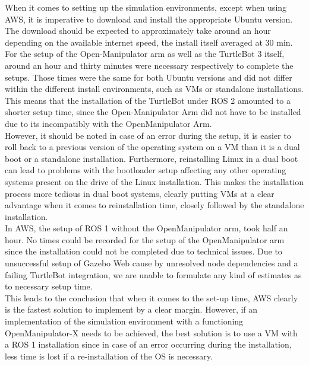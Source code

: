 \documentclass[plainarticle,zihtitle,english,final,hyperref,utf8]{zihpub}
\begin{document}
When it comes to setting up the simulation environments, except when using AWS, it is imperative to download and install the appropriate Ubuntu version. The download should be expected to approximately take around an hour depending on the available internet speed, the install itself averaged at 30 min. 
For the setup of the Open-Manipulator arm as well as the TurtleBot 3 itself, around an hour and thirty minutes were necessary respectively to complete the setups. Those times were the same for both Ubuntu versions and did not differ within the different install environments, such as VMs or standalone installations. This means that the installation of the TurtleBot under ROS 2 amounted to a shorter setup time, since the Open-Manipulator Arm did not have to be installed due to its incompatibly with the OpenManipulator Arm. \\
\newline
However, it should be noted in case of an error during the setup, it is easier to roll back to a previous version of the operating system on a VM than it is a dual boot or a standalone installation. Furthermore, reinstalling Linux in a dual boot can lead to problems with the bootloader setup affecting any other operating systems present on the drive of the Linux installation. This makes the installation process more tedious in dual boot systems, clearly putting VMs at a clear advantage when it comes to reinstallation time, closely followed by the standalone installation. \\
\newline
In AWS, the setup of ROS 1 without the OpenManipulator arm, took half an hour. No times could be recorded for the setup of the OpenManipulator arm since the installation could not be completed due to technical issues. 
Due to unsuccessful setup of Gazebo Web cause by unresolved node dependencies and a failing TurtleBot integration, we are unable to formulate any kind of estimates as to necessary setup time.\\
\newline
This leads to the conclusion that when it comes to the set-up time, AWS clearly is the fastest solution to implement by a clear margin. However, if an implementation of the simulation environment with a functioning OpenManipulator-X needs to be achieved, the best solution is to use a VM with a ROS 1 installation since in case of an error occurring during the installation, less time is lost if a re-installation of the OS is necessary. \\
\newline
\end{document}
